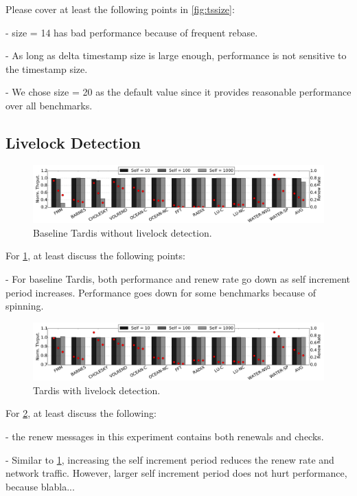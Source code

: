 \documentclass[12pt]{article}
\begin{document}
Please cover at least the following points in \cref{fig:tssize}:

- size = 14 has bad performance because of frequent rebase.

- As long as delta timestamp size is large enough, performance is not 
  sensitive to the timestamp size.

- We chose size = 20 as the default value since it provides reasonable 
  performance over all benchmarks.

\subsection{Livelock Detection}

\begin{figure}
	\centering
	\includegraphics[width=0.95\columnwidth]{figs/selfincr_nolive.pdf}
	\caption{ Baseline Tardis without livelock detection. }
	\label{fig:self-nolive}
\end{figure}

For \cref{fig:self-nolive}, at least discuss the following points:

- For baseline Tardis, both performance and renew rate go down as self
  increment period increases. Performance goes down for some
  benchmarks because of spinning.

\begin{figure}
	\centering
	\includegraphics[width=0.95\columnwidth]{figs/selfincr_live.pdf}
	\caption{ Tardis with livelock detection. }
	\label{fig:self-live}
\end{figure}

For \cref{fig:self-live}, at least discuss the following:

- the renew messages in this experiment contains both renewals and 
  checks.

- Similar to \cref{fig:self-nolive}, increasing the self increment 
  period reduces the renew rate and network traffic. However, larger 
  self increment period does not hurt performance, because blabla...
\end{document}
